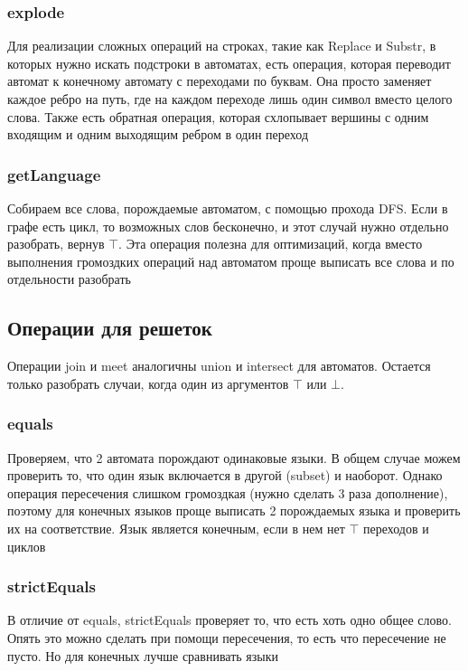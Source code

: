 \subsubsection*{explode}
Для реализации сложных операций на строках, такие как Replace и Substr, в которых нужно искать подстроки в автоматах, есть операция, которая переводит автомат к конечному автомату с переходами по буквам. Она просто заменяет каждое ребро на путь, где на каждом переходе лишь один символ вместо целого слова. Также есть обратная операция, которая схлопывает вершины с одним входящим и одним выходящим ребром в один переход

\subsubsection*{getLanguage}
Собираем все слова, порождаемые автоматом, с помощью прохода DFS. Если в графе есть цикл, то возможных слов бесконечно, и этот случай нужно отдельно разобрать, вернув $\top$. Эта операция полезна для оптимизаций, когда вместо выполнения громоздких операций над автоматом проще выписать все слова и по отдельности разобрать

\newpage
\subsection{Операции для решеток}
Операции join и meet аналогичны union и intersect для автоматов. Остается только разобрать случаи, когда один из аргументов $\top$ или $\bot$. 

\subsubsection*{equals}
Проверяем, что 2 автомата порождают одинаковые языки. В общем случае можем проверить то, что один язык включается в другой (subset) и наоборот. Однако операция пересечения слишком громоздкая (нужно сделать 3 раза дополнение), поэтому для конечных языков проще выписать 2 порождаемых языка и проверить их на соответствие. Язык является конечным, если в нем нет $\top$ переходов и циклов

\subsubsection*{strictEquals}
В отличие от equals, strictEquals проверяет то, что есть хоть одно общее слово. Опять это можно сделать при помощи пересечения, то есть что пересечение не пусто. Но для конечных лучше сравнивать языки





